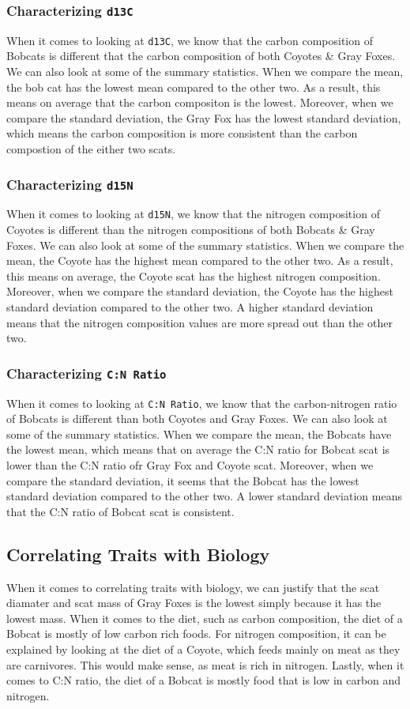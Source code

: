 \documentclass[a4paper]{article}
\begin{document}
\subsubsection{Characterizing \texttt{d13C}}
When it comes to looking at \texttt{d13C}, we know that the carbon composition of Bobcats is different that the carbon composition of both Coyotes \& Gray 
Foxes. We can also look at some of the summary statistics. When we compare the mean, the bob cat has the lowest mean compared to the other two. As a result,
this means on average that the carbon compositon is the lowest. Moreover, when we compare the standard deviation, the Gray Fox has the lowest standard 
deviation, which means the carbon composition is more consistent than the carbon compostion of the either two scats.

\subsubsection{Characterizing \texttt{d15N}}
When it comes to looking at \texttt{d15N}, we know that the nitrogen composition of Coyotes is different than the nitrogen compositions of both Bobcats \& Gray
Foxes. We can also look at some of the summary statistics. When we compare the mean, the Coyote has the highest mean compared to the other two. As a result,
this means on average, the Coyote scat has the highest nitrogen composition. Moreover, when we compare the standard deviation, the Coyote has the highest
standard deviation compared to the other two. A higher standard deviation means that the nitrogen composition values are more spread out than the other two.

\subsubsection{Characterizing \texttt{C:N Ratio}}
When it comes to looking at \texttt{C:N Ratio}, we know that the carbon-nitrogen ratio of Bobcats is different than both Coyotes and Gray Foxes. We can also
look at some of the summary statistics. When we compare the mean, the Bobcats have the lowest mean, which means that on average the C:N ratio for Bobcat scat
is lower than the C:N ratio ofr Gray Fox and Coyote scat. Moreover, when we compare the standard deviation, it seems that the Bobcat has the lowest standard
deviation compared to the other two. A lower standard deviation means that the C:N ratio of Bobcat scat is consistent.

\subsection{Correlating Traits with Biology}
When it comes to correlating traits with biology, we can justify that the scat diamater and scat mass of Gray Foxes is the lowest simply because it has the 
lowest mass. When it comes to the diet, such as carbon composition, the diet of a Bobcat is mostly of low carbon rich foods. For nitrogen composition, it can
be explained by looking at the diet of a Coyote, which feeds mainly on meat as they are carnivores. This would make sense, as meat is rich in nitrogen.
Lastly, when it comes to C:N ratio, the diet of a Bobcat is mostly food that is low in carbon and nitrogen.
\end{document}
